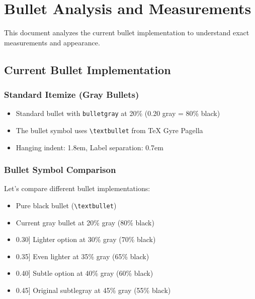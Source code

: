 \documentclass[11pt,letterpaper]{article}
\begin{document}
\section{Bullet Analysis and Measurements}

This document analyzes the current bullet implementation to understand exact measurements and appearance.

\subsection{Current Bullet Implementation}

\subsubsection{Standard Itemize (Gray Bullets)}

\begin{itemize}
\item Standard bullet with \texttt{bulletgray} at 20\% (0.20 gray = 80\% black)
\item The bullet symbol uses \texttt{\textbackslash textbullet} from TeX Gyre Pagella
\item Hanging indent: 1.8em, Label separation: 0.7em
\end{itemize}

\subsubsection{Bullet Symbol Comparison}

Let's compare different bullet implementations:

\begin{itemize}
\item[\textbullet] Pure black bullet (\texttt{\textbackslash textbullet})
\item[{\textcolor[gray]{0.25}{\textbullet}}] Current gray bullet at 20\% gray (80\% black)
\item[\textcolor{gray}[gray]{0.30}{\textbullet}] Lighter option at 30\% gray (70\% black)
\item[\textcolor{gray}[gray]{0.35}{\textbullet}] Even lighter at 35\% gray (65\% black)
\item[\textcolor{gray}[gray]{0.40}{\textbullet}] Subtle option at 40\% gray (60\% black)
\item[\textcolor{gray}[gray]{0.45}{\textbullet}] Original subtlegray at 45\% gray (55\% black)
\end{itemize}
\end{document}
